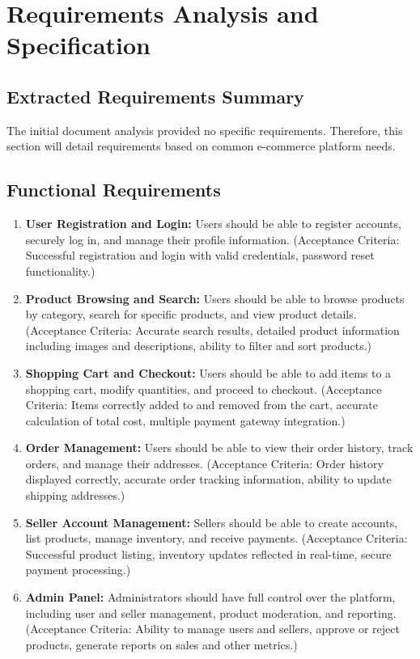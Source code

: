 \documentclass[11pt,a4paper,oneside]{article}
\begin{document}
\section{Requirements Analysis and Specification}

\subsection{Extracted Requirements Summary}

The initial document analysis provided no specific requirements.  Therefore, this section will detail requirements based on common e-commerce platform needs.

\subsection{Functional Requirements}

\begin{enumerate}
    \item \textbf{User Registration and Login:} Users should be able to register accounts, securely log in, and manage their profile information.  (Acceptance Criteria:  Successful registration and login with valid credentials, password reset functionality.)
    \item \textbf{Product Browsing and Search:} Users should be able to browse products by category, search for specific products, and view product details. (Acceptance Criteria:  Accurate search results, detailed product information including images and descriptions, ability to filter and sort products.)
    \item \textbf{Shopping Cart and Checkout:} Users should be able to add items to a shopping cart, modify quantities, and proceed to checkout.  (Acceptance Criteria:  Items correctly added to and removed from the cart, accurate calculation of total cost, multiple payment gateway integration.)
    \item \textbf{Order Management:} Users should be able to view their order history, track orders, and manage their addresses. (Acceptance Criteria:  Order history displayed correctly, accurate order tracking information, ability to update shipping addresses.)
    \item \textbf{Seller Account Management:} Sellers should be able to create accounts, list products, manage inventory, and receive payments. (Acceptance Criteria:  Successful product listing, inventory updates reflected in real-time, secure payment processing.)
    \item \textbf{Admin Panel:} Administrators should have full control over the platform, including user and seller management, product moderation, and reporting. (Acceptance Criteria:  Ability to manage users and sellers, approve or reject products, generate reports on sales and other metrics.)
\end{enumerate}
\end{document}
